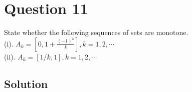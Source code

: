 \section*{Question 11}

State whether the following sequences of sets are monotone.\\
(i). \( A_{k}=\left[0,1+\frac{(-1)^{k}}{k}\right], k=1,2, \cdots \) \\
(ii). \( A_{k}=[1 / k, 1], k=1,2, \cdots \)

\subsection*{Solution}

